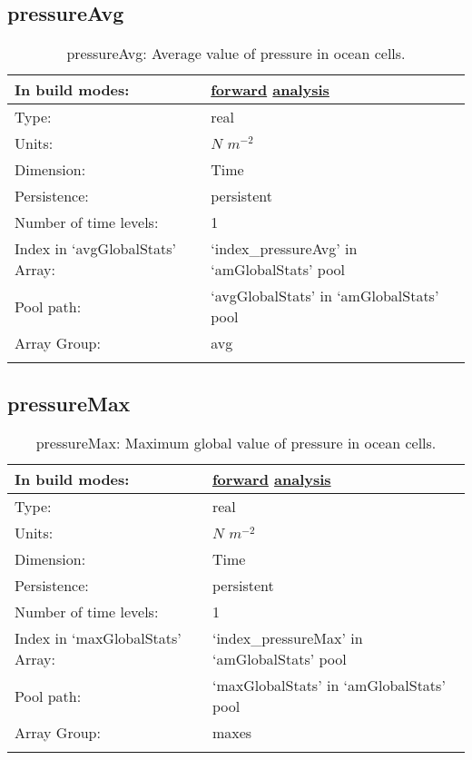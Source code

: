 \subsection[pressureAvg]{pressureAvg}
\label{subsec:var_sec_amGlobalStats_pressureAvg}
\begin{center}
\begin{longtable}{| p{2.0in} | p{4.0in} |}
        \hline 
        In build modes: & \hyperref[subsec:forward_var_tab_amGlobalStats]{forward} \hyperref[subsec:analysis_var_tab_amGlobalStats]{analysis} \\
        \hline 
        Type: & real \\
        \hline 
        Units: & $N$ $m^{-2}$ \\
        \hline 
        Dimension: & Time \\
        \hline 
        Persistence: & persistent \\
        \hline 
        Number of time levels: & 1 \\
        \hline 
		 Index in `avgGlobalStats' Array: & `index\_pressureAvg' in `amGlobalStats' pool \\
		 \hline 
            Pool path: & `avgGlobalStats' in `amGlobalStats' pool \\
		 \hline 
		 Array Group: & avg \\
		 \hline 
    \caption{pressureAvg: Average value of pressure in ocean cells.}
\end{longtable}
\end{center}
\subsection[pressureMax]{pressureMax}
\label{subsec:var_sec_amGlobalStats_pressureMax}
\begin{center}
\begin{longtable}{| p{2.0in} | p{4.0in} |}
        \hline 
        In build modes: & \hyperref[subsec:forward_var_tab_amGlobalStats]{forward} \hyperref[subsec:analysis_var_tab_amGlobalStats]{analysis} \\
        \hline 
        Type: & real \\
        \hline 
        Units: & $N$ $m^{-2}$ \\
        \hline 
        Dimension: & Time \\
        \hline 
        Persistence: & persistent \\
        \hline 
        Number of time levels: & 1 \\
        \hline 
		 Index in `maxGlobalStats' Array: & `index\_pressureMax' in `amGlobalStats' pool \\
		 \hline 
            Pool path: & `maxGlobalStats' in `amGlobalStats' pool \\
		 \hline 
		 Array Group: & maxes \\
		 \hline 
    \caption{pressureMax: Maximum global value of pressure in ocean cells.}
\end{longtable}
\end{center}
